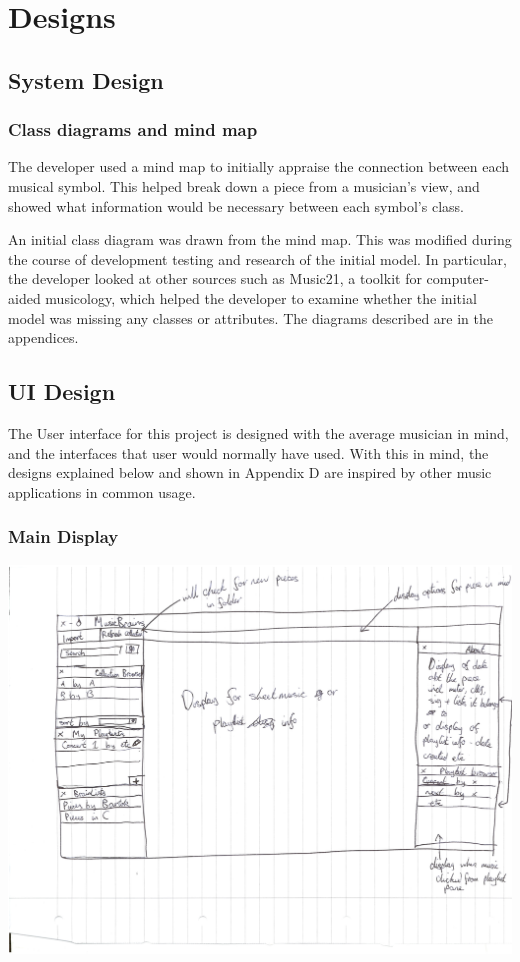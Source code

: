 \documentclass[bibtotocnumbered]{article}
\begin{document}
\section{Designs}
\subsection{System Design}
\subsubsection{Class diagrams and mind map}
The developer used a mind map to initially appraise the connection between each musical symbol. This helped break down a piece from a musician's view, and showed what information would be necessary between each symbol's class.

An initial class diagram was drawn from the mind map. This was modified during the course of development testing and research of the initial model. In particular, the developer looked at other sources such as Music21, a toolkit for computer-aided musicology\parencite{Music21}, which helped the developer to examine whether the initial model was missing any classes or attributes. The diagrams described are in the appendices.
\subsection{UI Design}
The User interface for this project is designed with the average musician in mind, and the interfaces that user would normally have used. With this in mind, the designs explained below and shown in Appendix D are inspired by other music applications in common usage.

\subsubsection{Main Display}
\begin{center}
\includegraphics[width=380pt]{main_view.png}
\end{center}
\end{document}
